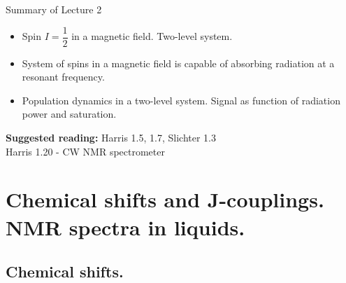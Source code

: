 \documentclass{beamer}
\begin{document}
\begin{frame}{Summary of Lecture 2}
	\begin{itemize}
		\item Spin $I= \dfrac{1}{2}$ in a magnetic field. Two-level system.
		\item System of spins in a magnetic field is capable of absorbing radiation at a resonant frequency.
		\item Population dynamics in a two-level system. Signal as function of radiation power and saturation.
	\end{itemize}
	\textbf{Suggested reading: } Harris 1.5, 1.7, Slichter 1.3 \\
	Harris 1.20 - CW NMR spectrometer
\end{frame}

\section{Chemical shifts and J-couplings. NMR spectra in liquids.}
\subsection{Chemical shifts.}
\end{document}
